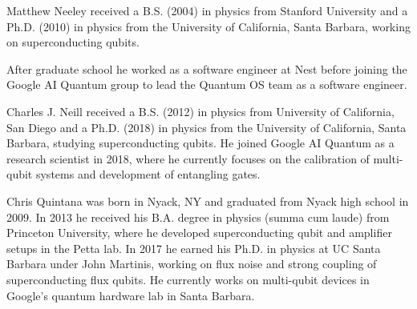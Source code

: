 \documentclass[journal]{IEEEtran}
\begin{document}
\begin{IEEEbiography}{Matthew Neeley} received a B.S. (2004) in physics from Stanford University and a Ph.D. (2010) in physics from the University of California, Santa Barbara, working on superconducting qubits. 

After graduate school he worked as a software engineer at Nest before joining the Google AI Quantum group to lead the Quantum OS team as a software engineer.


\end{IEEEbiography}
\begin{IEEEbiography}{Charles J. Neill} received a B.S. (2012) in physics from University of California, San Diego and a Ph.D. (2018) in physics from the University of California, Santa Barbara, studying  superconducting qubits. He joined Google AI Quantum as a research scientist in 2018, where he currently focuses on the calibration of multi-qubit systems and development of entangling gates.


\end{IEEEbiography}
\begin{IEEEbiography}{Chris Quintana} was born in Nyack, NY and graduated from Nyack high school in 2009. In 2013 he received his B.A. degree in physics (summa cum laude) from Princeton University, where he developed superconducting qubit and amplifier setups in the Petta lab. In 2017 he earned his Ph.D. in physics at UC Santa Barbara under John Martinis, working on flux noise and strong coupling of superconducting flux qubits. He currently works on multi-qubit devices in Google’s quantum hardware lab in Santa Barbara.


\end{IEEEbiography}
\end{document}
